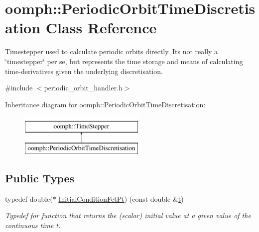 \hypertarget{classoomph_1_1PeriodicOrbitTimeDiscretisation}{}\section{oomph\+:\+:Periodic\+Orbit\+Time\+Discretisation Class Reference}
\label{classoomph_1_1PeriodicOrbitTimeDiscretisation}


Timestepper used to calculate periodic orbits directly. It\textquotesingle{}s not really a \char`\"{}timestepper\char`\"{} per se, but represents the time storage and means of calculating time-\/derivatives given the underlying discretisation.  




{\ttfamily \#include $<$periodic\+\_\+orbit\+\_\+handler.\+h$>$}

Inheritance diagram for oomph\+:\+:Periodic\+Orbit\+Time\+Discretisation\+:\begin{figure}[H]
\begin{center}
\leavevmode
\includegraphics[height=2.000000cm]{classoomph_1_1PeriodicOrbitTimeDiscretisation}
\end{center}
\end{figure}
\subsection*{Public Types}
\begin{DoxyCompactItemize}
\item 
typedef double($\ast$ \hyperlink{classoomph_1_1PeriodicOrbitTimeDiscretisation_a0bccd8d239689d95cf7422d877a5eed8}{Initial\+Condition\+Fct\+Pt}) (const double \&\hyperlink{cfortran_8h_af6f0bd3dc13317f895c91323c25c2b8f}{t})
\begin{DoxyCompactList}\small\item\em Typedef for function that returns the (scalar) initial value at a given value of the continuous time t. \end{DoxyCompactList}\end{DoxyCompactItemize}
